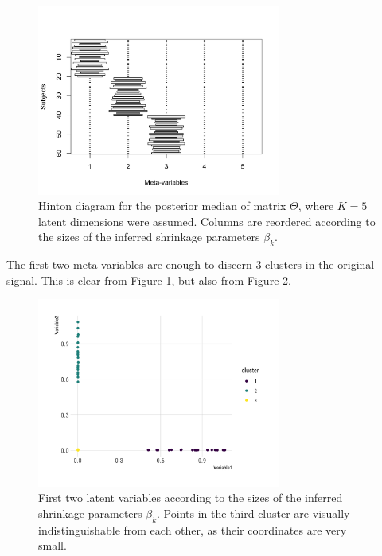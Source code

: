 \documentclass[]{article}
\begin{document}
\begin{figure}
	\centering
	\includegraphics[width=8cm]{theta_hat_reordered.png}
	\caption{Hinton diagram for the posterior median of matrix $\Theta$, where $K=5$ latent dimensions were assumed. Columns are reordered according to the sizes of the inferred shrinkage parameters $\beta_k$.}
	\label{fig:theta_hat_reordered}
\end{figure}

The first two meta-variables are enough to discern 3 clusters in the original signal. This is clear from Figure \ref{fig:theta_hat_reordered}, but also from Figure \ref{fig:2var}.

\begin{figure}
	\centering
	\includegraphics[width=8cm]{2var.png}
	\caption{First two latent variables according to the sizes of the inferred shrinkage parameters $\beta_k$. Points in the third cluster are visually indistinguishable from each other, as their coordinates are very small.}
	\label{fig:2var}
\end{figure}
\end{document}

